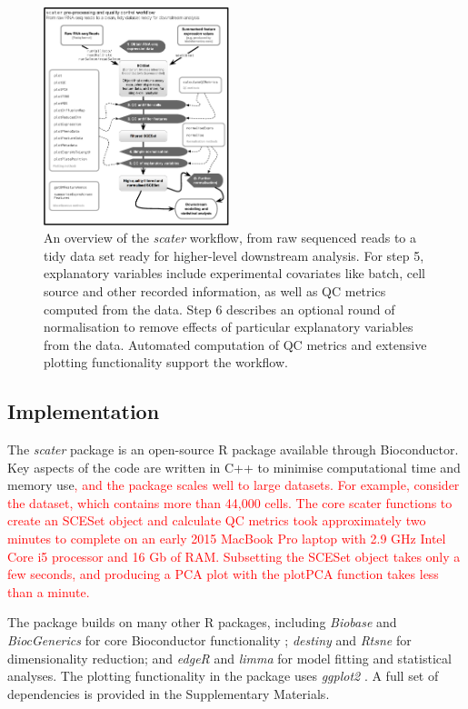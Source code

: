 \documentclass{bioinfo}
\newcommand{\revised}[1]{\textcolor{red}{#1}}
\begin{document}
\begin{methods}
\begin{figure}[!tpb]%
\centerline{\includegraphics[width=0.48\textwidth]{scater_qc_workflow.eps}}
\caption{An overview of the \emph{scater} workflow, from raw sequenced reads to a tidy data set ready for higher-level downstream analysis. For step 5, explanatory variables include experimental covariates like batch, cell source and other recorded information, as well as QC metrics computed from the data. Step 6 describes an optional round of normalisation to remove effects of particular explanatory variables from the data. Automated computation of QC metrics and extensive plotting functionality support the workflow.}\label{fig:01}
\end{figure}


\subsection{Implementation}\label{implementation}

The \emph{scater} package is an open-source R package available through     Bioconductor. Key aspects of the code are written in C++ to minimise computational time and memory use\revised{, and the package scales well to large datasets. For example, consider the \citet{Macosko2015-vt} dataset, which contains more than 44,000 cells. The core scater functions to create an SCESet object and calculate QC metrics took approximately two minutes to complete on an early 2015 MacBook Pro laptop with 2.9 GHz Intel Core i5 processor and 16 Gb of RAM. Subsetting the SCESet object takes only a few seconds, and producing a PCA plot with the plotPCA function takes less than a minute.}

The package builds on many other R packages, including \emph{Biobase} and \emph{BiocGenerics} for core Bioconductor functionality \citep{Huber2015-en}; \emph{destiny} \citep{Angerer2015-sw} and \emph{Rtsne} for dimensionality reduction; and \emph{edgeR} \citep{Robinson2010-ky} and \emph{limma} \citep{Ritchie2015-so} for model fitting and statistical analyses. The plotting functionality in the package uses \emph{ggplot2} \citep{Wickham2016-dc}. A full set of dependencies is provided in the Supplementary Materials.

\end{methods}
\end{document}
